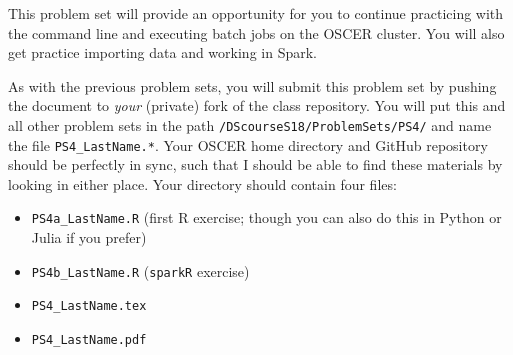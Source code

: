 \documentclass[12pt,english]{exam}
\begin{document}
This problem set will provide an opportunity for you to continue practicing with the command line and executing batch jobs on the OSCER cluster. You will also get practice importing data and working in Spark. 

As with the previous problem sets, you will submit this problem set by pushing the document to \emph{your} (private) fork of the class repository. You will put this and all other problem sets in the path \texttt{/DScourseS18/ProblemSets/PS4/} and name the file \texttt{PS4\_LastName.*}. Your OSCER home directory and GitHub repository should be perfectly in sync, such that I should be able to find these materials by looking in either place. Your directory should contain four files:
\begin{itemize}
    \item \texttt{PS4a\_LastName.R} (first R exercise; though you can also do this in Python or Julia if you prefer)
    \item \texttt{PS4b\_LastName.R} (\texttt{sparkR} exercise)
    \item \texttt{PS4\_LastName.tex}
    \item \texttt{PS4\_LastName.pdf}
\end{itemize}
\end{document}
